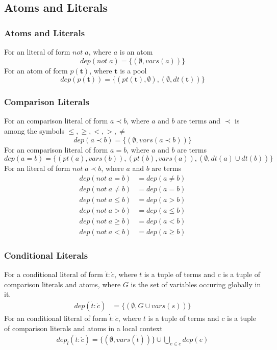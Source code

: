\documentclass{article}
\newcommand{\pool}[1]{\boldsymbol{#1}}
\newcommand{\tuple}[1]{\dot{#1}}
\newcommand{\set}[1]{\{#1\}}
\newcommand{\dep}[2]{\{(#1), (#2)\}}
\begin{document}
	\subsection{Atoms and Literals}
	\subsubsection{Atoms and Literals}
	For an literal of form $not \; a$, where $a$ is an atom
	\begin{equation*}
		dep(not \; a) = \set{(\emptyset, vars(a))}
	\end{equation*}
	For an atom of form $p(\pool{t})$, where $\pool{t}$ is a pool
	\begin{equation*}
		dep(p(\pool{t})) = \dep{pt(\pool{t}), \emptyset}{\emptyset, dt(\pool{t})}
	\end{equation*}

	\subsubsection{Comparison Literals}
	For an comparison literal of form $a \prec b$, where $a$ and $b$ are terms and $\prec$ is among the symbols $\leq,\ge,<,>,\neq$
	\begin{equation*}
		dep(a \prec b) = \set{(\emptyset, vars(a \prec b))}
	\end{equation*}
	For an comparison literal of form $a = b$, where $a$ and $b$ are terms
	\begin{equation*}
		dep(a = b) = \set{(pt(a), vars(b)), (pt(b), vars(a)), (\emptyset, dt(a) \cup dt(b))}
	\end{equation*}
	For an literal of form $not \; a \prec b$, where $a$ and $b$ are terms
	\begin{align*}
		dep(not \; a = b) &= dep(a \neq b) \\
		dep(not \; a \neq b) &= dep(a = b) \\
		dep(not \; a \leq b) &= dep(a > b) \\
		dep(not \; a > b) &= dep(a \leq b) \\
		dep(not \; a \ge b) &= dep(a < b) \\
		dep(not \; a < b) &= dep(a \ge b)
	\end{align*}

	\subsubsection{Conditional Literals}
	For a conditional literal of form $\tuple{t} : \tuple{c}$, where $t$ is a tuple of terms and $c$ is a tuple of comparison literals and atoms, where $G$ is the set of variables occuring globally in it.
	\begin{align*}
		dep(\tuple{t} : \tuple{c}) &= \set{(\emptyset, G \cup vars(s))}
	\end{align*}
	For an conditional literal of form $\tuple{t} : \tuple{c}$, where $t$ is a tuple of terms and $c$ is a tuple of comparison literals and atoms in a local context
	\begin{align*}
		dep_l(\tuple{t} : \tuple{c}) = \set{(\emptyset, vars(\tuple{t}))} \cup \bigcup_{e \in \tuple{c}} dep(e)
	\end{align*}
\end{document}

